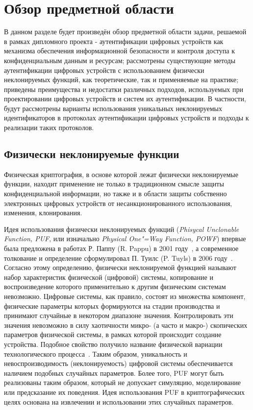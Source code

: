 \section{Обзор предметной области}
\label{sec:domain:intro}

В данном разделе будет произведён обзор предметной области задачи, решаемой в рамках дипломного проекта - аутентификации цифровых устройств как механизма обеспечения информационной безопасности и контроля доступа к конфиденциальным данным и ресурсам; рассмотрены существующие методы аутентификации цифровых устройств с использованием физически неклонируемых функций, как теоретические, так и применяемые на практике; приведены преимущества и недостатки различных подходов, используемых при проектировании цифровых устройств и систем их аутентификации.
В частности, будут рассмотрены варианты использования уникальных неклонируемых идентификаторов в протоколах аутентификации цифровых устройств и подходы к реализации таких протоколов.

\subsection{Физически неклонируемые функции}
\label{sub:domain:pufs}
Физическая криптография, в основе которой лежат физически неклонируемые функции, находит применение не только в традиционном смысле защиты конфиденциальной информации, но также и в области защиты собственно электронных цифровых устройств от несанкционированного использования, изменения, клонирования.

Идея использования физически неклонируемых функций (\emph{Phisycal Unclonable Function, PUF}, или изначально \emph{Physical One"=Way Function, POWF}) впервые была предложена в работах Р. Паппу (R. Pappu) в 2001 году~\cite{rpappu_powf}, а современное толкование и определение сформулировал П. Туилс (P. Tuyls) в 2006 году~\cite{ptuyls_pufs}. Согласно этому определению, физически неклонируемой функцией называют набор характеристик физической (цифровой) системы, копирование и воспроизведение которого применительно к другим физическим системам невозможно. Цифровые системы, как правило, состоят из множества компонент, физические параметры которых формируются на стадии производства и принимают случайные в некотором диапазоне значения. Контролировать эти значения невозможно в силу хаотичности микро- (а часто и макро-) скопических параметров физической системы, в рамках которой происходит создание устройства. Подобное свойство получило название физической вариации технологического процесса~\cite{ivaniuk_pufs}. Таким образом, уникальность и невоспроизводимость (неклонируемость) цифровой системы обеспечивается наличием подобных случайных параметров. Более того, PUF могут быть реализованы таким образом, который не допускает симуляцию, моделирование или предсказание их поведения. Идея использования PUF в криптографических целях основана на извлечении и использовании этих случайных параметров.

